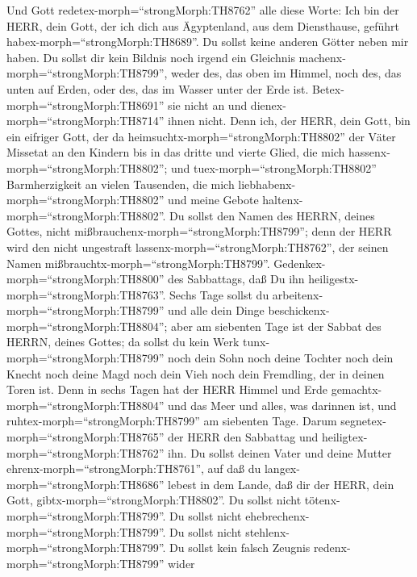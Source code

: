  Und Gott redetex-morph=``strongMorph:TH8762'' alle diese
Worte:  Ich bin der HERR, dein Gott, der ich dich aus
Ägyptenland, aus dem Diensthause, geführt
habex-morph=``strongMorph:TH8689''.  Du sollst keine anderen
Götter neben mir haben.  Du sollst dir kein Bildnis noch
irgend ein Gleichnis machenx-morph=``strongMorph:TH8799'', weder des,
das oben im Himmel, noch des, das unten auf Erden, oder des, das im
Wasser unter der Erde ist. 
Betex-morph=``strongMorph:TH8691'' sie nicht an und
dienex-morph=``strongMorph:TH8714'' ihnen nicht. Denn ich, der HERR,
dein Gott, bin ein eifriger Gott, der da
heimsuchtx-morph=``strongMorph:TH8802'' der Väter Missetat an den
Kindern bis in das dritte und vierte Glied, die mich
hassenx-morph=``strongMorph:TH8802'';  und
tuex-morph=``strongMorph:TH8802'' Barmherzigkeit an vielen Tausenden,
die mich liebhabenx-morph=``strongMorph:TH8802'' und meine Gebote
haltenx-morph=``strongMorph:TH8802''.  Du sollst den Namen
des HERRN, deines Gottes, nicht
mißbrauchenx-morph=``strongMorph:TH8799''; denn der HERR wird den nicht
ungestraft lassenx-morph=``strongMorph:TH8762'', der seinen Namen
mißbrauchtx-morph=``strongMorph:TH8799''. 
Gedenkex-morph=``strongMorph:TH8800'' des Sabbattags, daß Du ihn
heiligestx-morph=``strongMorph:TH8763''.  Sechs Tage sollst
du arbeitenx-morph=``strongMorph:TH8799'' und alle dein Dinge
beschickenx-morph=``strongMorph:TH8804'';  aber am
siebenten Tage ist der Sabbat des HERRN, deines Gottes; da sollst du
kein Werk tunx-morph=``strongMorph:TH8799'' noch dein Sohn noch deine
Tochter noch dein Knecht noch deine Magd noch dein Vieh noch dein
Fremdling, der in deinen Toren ist.  Denn in sechs Tagen
hat der HERR Himmel und Erde gemachtx-morph=``strongMorph:TH8804'' und
das Meer und alles, was darinnen ist, und
ruhtex-morph=``strongMorph:TH8799'' am siebenten Tage. Darum
segnetex-morph=``strongMorph:TH8765'' der HERR den Sabbattag und
heiligtex-morph=``strongMorph:TH8762'' ihn.  Du sollst
deinen Vater und deine Mutter ehrenx-morph=``strongMorph:TH8761'', auf
daß du langex-morph=``strongMorph:TH8686'' lebest in dem Lande, daß dir
der HERR, dein Gott, gibtx-morph=``strongMorph:TH8802''. 
Du sollst nicht tötenx-morph=``strongMorph:TH8799''.  Du
sollst nicht ehebrechenx-morph=``strongMorph:TH8799''.  Du
sollst nicht stehlenx-morph=``strongMorph:TH8799''.  Du
sollst kein falsch Zeugnis redenx-morph=``strongMorph:TH8799'' wider
